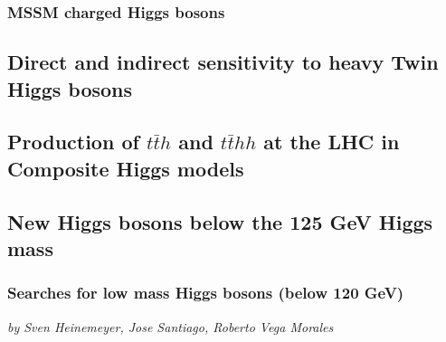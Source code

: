 \documentclass[../report.tex]{subfiles}
\providecommand{\main}{..}
\begin{document}
\subsubsection{MSSM charged Higgs bosons}



\subsection{Direct and indirect sensitivity to heavy Twin Higgs bosons}


\subsection{Production of $t\bar{t}h$ and $t\bar{t}h h$ at the LHC in Composite Higgs models}\label{Sec:9.7}


%







\subsection{New Higgs bosons below the 125 GeV Higgs mass}\label{Sec:9.8}

\subsubsection{Searches for low mass Higgs bosons (below 120 GeV)}
\begin{center}
    \textit{by Sven Heinemeyer, Jose Santiago, Roberto Vega Morales}
\end{center}

\end{document}
